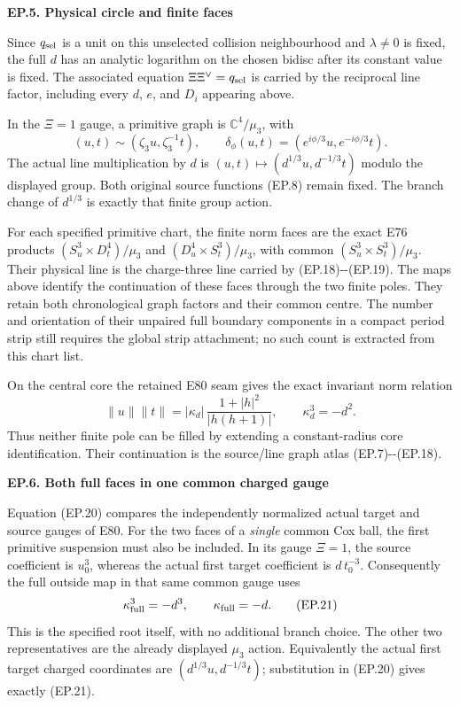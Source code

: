 \par

\medskip\noindent\textbf{EP.5. Physical circle and finite faces}

\par\nobreak

Since \(q_{\rm sel}\) is a unit on this unselected collision
neighbourhood and \(\lambda\ne0\) is fixed, the full \(d\)
has an analytic logarithm on the chosen bidisc after its
constant value is fixed. The associated equation
\(\Xi\Xi^\vee=q_{\rm sel}\) is carried by the reciprocal
line factor, including every \(d\), \(e\), and \(D_i\)
appearing above.

In the \(\Xi=1\) gauge, a primitive graph is
\(\mathbb C^4/\mu_3\), with
\[
 (u,t)\sim(\zeta_3u,\zeta_3^{-1}t),\qquad
 \delta_\phi(u,t)=(e^{i\phi/3}u,e^{-i\phi/3}t).
 \tag{EP.19}
\]
The actual line multiplication by \(d\) is
\((u,t)\mapsto(d^{1/3}u,d^{-1/3}t)\) modulo the displayed
group. Both original source functions (EP.8) remain fixed.
The branch change of \(d^{1/3}\) is exactly that finite
group action.

For each specified primitive chart, the finite norm faces are
the exact E76 products
\((S^3_u\times D^4_t)/\mu_3\) and
\((D^4_u\times S^3_t)/\mu_3\), with common
\((S^3_u\times S^3_t)/\mu_3\). Their physical line is
the charge-three line carried by (EP.18)-\/-(EP.19).
The maps above identify the continuation of these faces
through the two finite poles. They retain both chronological
graph factors and their common centre. The number and
orientation of their unpaired full boundary components in
a compact period strip still requires the global strip
attachment; no such count is extracted from this chart list.

On the central core the retained E80 seam gives the exact
invariant norm relation
\[
 \|u\|\|t\|=
 |\kappa_d|\,\frac{1+|h|^2}{|h(h+1)|},
 \qquad \kappa_d^3=-d^2 .
 \tag{EP.20}
\]
Thus neither finite pole can be filled by extending a
constant-radius core identification. Their continuation
is the source/line graph atlas (EP.7)-\/-(EP.18).

\par

\medskip\noindent\textbf{EP.6. Both full faces in one common charged gauge}

\par\nobreak

Equation (EP.20) compares the independently normalized actual
target and source gauges of E80. For the two faces of a \emph{single}
common Cox ball, the first primitive suspension must also be
included. In its gauge \(\Xi=1\), the source coefficient is
\(u_0^3\), whereas the actual first target coefficient is
\(d\,t_0^{-3}\). Consequently the full outside map in that
same common gauge uses
\[
 \kappa_{\rm full}^3=-d^3,\qquad
 \kappa_{\rm full}=-d .
 \tag{EP.21}
\]
This is the specified root itself, with no additional branch
choice. The other two representatives are the already displayed
\(\mu_3\) action. Equivalently the actual first target charged
coordinates are \((d^{1/3}u,d^{-1/3}t)\); substitution in
(EP.20) gives exactly (EP.21).

